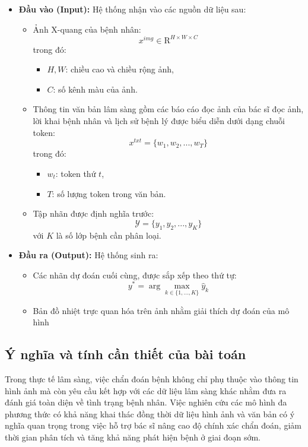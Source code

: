 \begin{itemize}
  \item \textbf{Đầu vào (Input):} Hệ thống nhận vào các nguồn dữ liệu sau:

  \begin{itemize}
    \item Ảnh X-quang của bệnh nhân:
    \[
        x^{img} \in \mathrm{R}^{H \times W \times C}
    \]
    trong đó:
    \begin{itemize}
        \item $H, W$: chiều cao và chiều rộng ảnh,
        \item $C$: số kênh màu của ảnh.
    \end{itemize}

    \pagebreak

    \item Thông tin văn bản lâm sàng gồm các báo cáo đọc ảnh của bác sĩ đọc ảnh, lời khai bệnh nhân và lịch sử bệnh lý được biểu diễn dưới dạng chuỗi token:
    \[
        x^{txt} = \{w_1, w_2, ..., w_T\}
    \]
    trong đó:
    \begin{itemize}
        \item $w_t$: token thứ $t$,
        \item $T$: số lượng token trong văn bản.
    \end{itemize}

    \item Tập nhãn được định nghĩa trước:
    \[
        \mathcal{Y} = \{y_1, y_2, ..., y_K\}
    \]
    với $K$ là số lớp bệnh cần phân loại.
  \end{itemize}

  \item \textbf{Đầu ra (Output):} Hệ thống sinh ra:

  \begin{itemize}
    \item Các nhãn dự đoán cuối cùng, được sắp xếp theo thứ tự:
    \[
        y^{*} = \arg\max_{k \in \{1,...,K\}} \hat{y}_k
    \]

    \item Bản đồ nhiệt trực quan hóa trên ảnh nhằm giải thích dự đoán của mô hình
  \end{itemize}
\end{itemize}

\subsection{Ý nghĩa và tính cần thiết của bài toán}
Trong thực tế lâm sàng, việc chẩn đoán bệnh không chỉ phụ thuộc vào thông tin hình ảnh mà còn yêu cầu kết hợp với các dữ liệu lâm sàng khác nhằm đưa ra đánh giá toàn diện về tình trạng bệnh nhân. Việc nghiên cứu các mô hình đa phương thức có khả năng khai thác đồng thời dữ liệu hình ảnh và văn bản có ý nghĩa quan trọng trong việc hỗ trợ bác sĩ nâng cao độ chính xác chẩn đoán, giảm thời gian phân tích và tăng khả năng phát hiện bệnh ở giai đoạn sớm.

